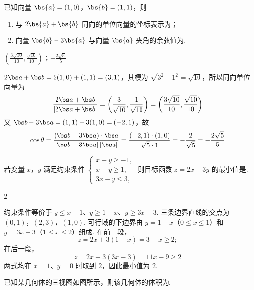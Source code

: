 \begin{problem}
已知向量 \(\bs{a} = (1,0)\)，\(\bs{b} = (1,1)\)，则
\begin{enumerate}
\item 与 \(2\bs{a} + \bs{b}\) 同向的单位向量的坐标表示为\fillinblank{}；
\item 向量 \(\bs{b} - 3\bs{a}\) 与向量 \(\bs{a}\) 夹角的余弦值为\fillinblank{}.
\end{enumerate}
\end{problem}

\begin{answer}
\(\left(\frac{3\sqrt{10}}{10},\frac{\sqrt{10}}{10}\right)\)；\(-\frac{2\sqrt{5}}{5}\)
\end{answer}

\begin{solution}
\(2\bs a+\bs b=2(1,0)+(1,1)=(3,1)\)，其模为 \(\sqrt{3^{2}+1^{2}}=\sqrt{10}\)，所以同向单位向量为
\[
\frac{2\bs a+\bs b}{|2\bs a+\bs b|}=\left(\frac3{\sqrt{10}},\frac1{\sqrt{10}}\right)=\left(\frac{3\sqrt{10}}{10},\frac{\sqrt{10}}{10}\right)
\]
又 \(\bs b-3\bs a=(1,1)-3(1,0)=(-2,1)\)，故
\[
\cos\theta=\frac{(\bs b-3\bs a)\cdot\bs a}{|\bs b-3\bs a|\,|\bs a|}=\frac{(-2,1)\cdot(1,0)}{\sqrt5\cdot1}=-\frac2{\sqrt5}=-\frac{2\sqrt5}{5}
\]
\end{solution}

\begin{problem}
若变量 \(x\)，\(y\) 满足约束条件 \(\begin{cases}
x - y \geqslant -1,\\
x + y \geqslant 1,\\
3x - y \leqslant 3,
\end{cases}\)
则目标函数 \(z = 2x + 3y\) 的最小值是\fillinblank{}.
\end{problem}

\begin{answer}
\(2\)
\end{answer}

\begin{solution}
约束条件等价于 \(y\leqslant x+1\)、\(y\geqslant1-x\)、\(y\geqslant3x-3\). 三条边界直线的交点为
\((0,1)\)，\((2,3)\)，\((1,0)\).
可行域的下边界由 \(y=1-x\)（\(0\leqslant x\leqslant1\)）和 \(y=3x-3\)（\(1\leqslant x\leqslant2\)）组成. 在前一段，
\[
z=2x+3(1-x)=3-x\geqslant2;
\]
在后一段，
\[
z=2x+3(3x-3)=11x-9\geqslant2
\]
两式均在 \(x=1\)、\(y=0\) 时取到 \(2\)，因此最小值为 \(2\).
\end{solution}

\begin{problem}
已知某几何体的三视图如图所示，则该几何体的体积为\fillinblank{}.

\end{problem}

